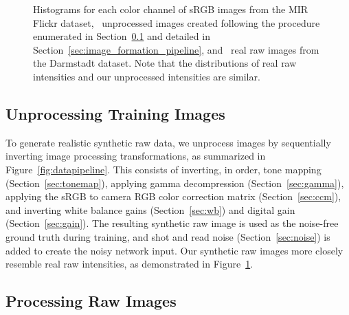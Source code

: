 \documentclass[10pt,twocolumn,letterpaper]{article}
\begin{document}
\newcommand{\histwidth}{0.305\linewidth}
\begin{figure}[t]
\begin{center}
\end{center}
   \caption{
   Histograms for each color channel of  sRGB images from the MIR Flickr dataset, ~unprocessed images created following the procedure enumerated in Section~\ref{sec:preproc} and detailed in Section~\ref{sec:image_formation_pipeline}, and ~real raw images from the Darmstadt dataset. Note that the distributions of real raw intensities and our unprocessed intensities are similar.
}
   \label{fig:histograms}
\end{figure}

\subsection{Unprocessing Training Images}
\label{sec:preproc}

To generate realistic synthetic raw data, we unprocess images by sequentially inverting image processing transformations, as summarized in Figure~\ref{fig:datapipeline}. This consists of inverting, in order, tone mapping (Section~\ref{sec:tonemap}), applying gamma decompression (Section~\ref{sec:gamma}), applying the sRGB to camera RGB color correction matrix (Section~\ref{sec:ccm}), and inverting white balance gains (Section~\ref{sec:wb}) and digital gain (Section~\ref{sec:gain}). The resulting synthetic raw image is used as the noise-free ground truth during training, and shot and read noise (Section~\ref{sec:noise}) is added to create the noisy network input. Our synthetic raw images more closely resemble real raw intensities, as demonstrated in Figure~\ref{fig:histograms}.

\subsection{Processing Raw Images}
\label{sec:postproc}
\end{document}

